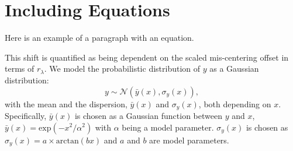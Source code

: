 \section{Including Equations}

Here is an example of a paragraph with an equation.

This shift is quantified as being dependent on the scaled mis-centering offset in terms of $r_\lambda$. We model the probabilistic distribution of $y$ as a Gaussian distribution:
\begin{equation}
y\sim\mathcal{N}(\bar{y}(x), \sigma_y (x)),
\end{equation} 
with the mean and the dispersion, $\bar{y}( x)$ and $\sigma_{y} ( x)$, both depending on $x$. Specifically, $\bar{y}( x)$ is chosen as a Gaussian function between $y$ and $x$, $\bar{y}(x)=\mathrm{exp}(-x^2/\alpha^2)$ with $\alpha$ being a model parameter. $\sigma_y (x)$ is chosen as $\sigma_y (x)=a\times\mathrm{arctan}(bx)$ and $a$ and $b$ are model parameters.
